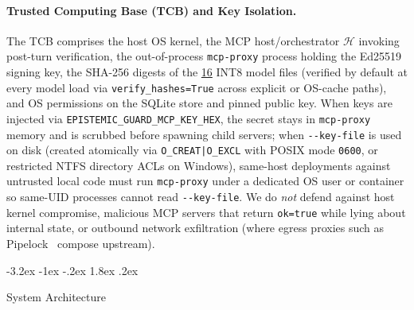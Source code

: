 \documentclass[10pt,twocolumn]{article}
\makeatletter
\renewcommand\section{\@startsection{section}{1}{\z@}%
  {-3.2ex \@plus -1ex \@minus -.2ex}%
  {1.8ex \@plus .2ex}%
  {\normalfont\Large\bfseries\raggedright}}
\makeatother
\begin{document}
\paragraph{Trusted Computing Base (TCB) and Key Isolation.}
The TCB comprises the host OS kernel, the MCP host/orchestrator $\mathcal{H}$ invoking post-turn verification, the out-of-process \texttt{mcp-proxy} process holding the Ed25519 signing key, the SHA-256 digests of the \href{https://github.com/AlienatedAliens/epistemic-guard/blob/v0.5.2/results/table1_architecture.json\#L25}{16} INT8 model files (verified by default at every model load via \texttt{verify\_\allowbreak hashes=True} across explicit or OS-cache paths), and OS permissions on the SQLite store and pinned public key. When keys are injected via \texttt{EPISTEMIC\_\allowbreak GUARD\_\allowbreak MCP\_\allowbreak KEY\_\allowbreak HEX}, the secret stays in \texttt{mcp-proxy} memory and is scrubbed before spawning child servers; when \texttt{-{-}key-file} is used on disk (created atomically via \texttt{O\_\allowbreak CREAT|\allowbreak O\_\allowbreak EXCL} with POSIX mode \texttt{0600}, or restricted NTFS directory ACLs on Windows), same-host deployments against untrusted local code must run \texttt{mcp-proxy} under a dedicated OS user or container so same-UID processes cannot read \texttt{-{-}key-file}. We do \emph{not} defend against host kernel compromise, malicious MCP servers that return \texttt{ok=true} while lying about internal state, or outbound network exfiltration (where egress proxies such as Pipelock~\cite{pipelock2026} compose upstream).

\section{System Architecture}
\label{sec:arch}
\end{document}
